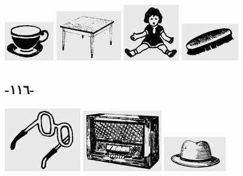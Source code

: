 \documentclass[a5paper]{article}
\begin{document}
 \includegraphics[width=0.8543in,height=0.6772in]{images/MuhammadBagauddinprettified-img327.png}   \includegraphics[width=1.1354in,height=0.8646in]{images/MuhammadBagauddinprettified-img328.png}   \includegraphics[width=0.9689in,height=0.9791in]{images/MuhammadBagauddinprettified-img329.png}   \includegraphics[width=0.9898in,height=0.6457in]{images/MuhammadBagauddinprettified-img330.png} 

\subsection{-١١٦-}
 \includegraphics[width=1.3228in,height=1.1043in]{images/MuhammadBagauddinprettified-img331.png}   \includegraphics[width=1.3752in,height=1.0626in]{images/MuhammadBagauddinprettified-img332.png}   \includegraphics[width=1.0835in,height=0.6043in]{images/MuhammadBagauddinprettified-img333.png} 
\end{document}
